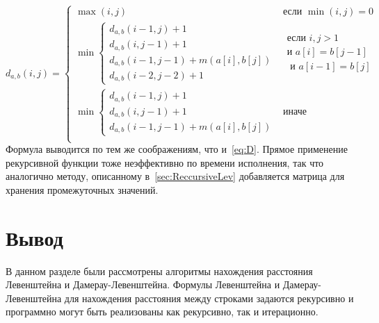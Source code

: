 \documentclass[12pt]{report}
\begin{document}
    \begin{equation}
        \label{eq:dl}
        d_{a, b}(i, j) =
        \begin{cases}
            \max(i, j)
            & \text{если } \min(i, j) = 0
            \\
            \min
            \begin{cases}
                d_{a, b}(i - 1, j) + 1
                \\
                d_{a, b}(i, j - 1) + 1
                \\
                d_{a, b}(i - 1, j - 1) + m(a[i], b[j])
                \\
                d_{a, b}(i - 2, j - 2) + 1
            \end{cases}
            & \begin{aligned}
                  \text{если } i, j > 1 \\ \text{и } a[i] = b[j - 1] \\ \text{ и } a[i - 1] = b[j]
            \end{aligned}
            \\
            \min
            \begin{cases}
                d_{a, b}(i - 1, j) + 1
                \\
                d_{a, b}(i, j - 1) + 1
                \\
                d_{a, b}(i - 1, j - 1) + m(a[i], b[j])
            \end{cases}
            & \text{иначе}
            \\
        \end{cases}
    \end{equation}
    Формула выводится по тем же соображениям, что и~\ref{eq:D}. Прямое применение рекурсивной функции тоже
    неэффективно по времени исполнения, так что аналогично методу, описанному в~\ref{sec:ReccursiveLev}
    добавляется матрица для хранения промежуточных значений.


    \section{Вывод}
    В данном разделе были рассмотрены алгоритмы нахождения расстояния Левенштейна и Дамерау-Левенштейна.
    Формулы Левенштейна и Дамерау-Левенштейна для нахождения расстояния между строками задаются рекурсивно
    и программно могут быть реализованы как рекурсивно, так и итерационно.

    \newpage
\end{document}
